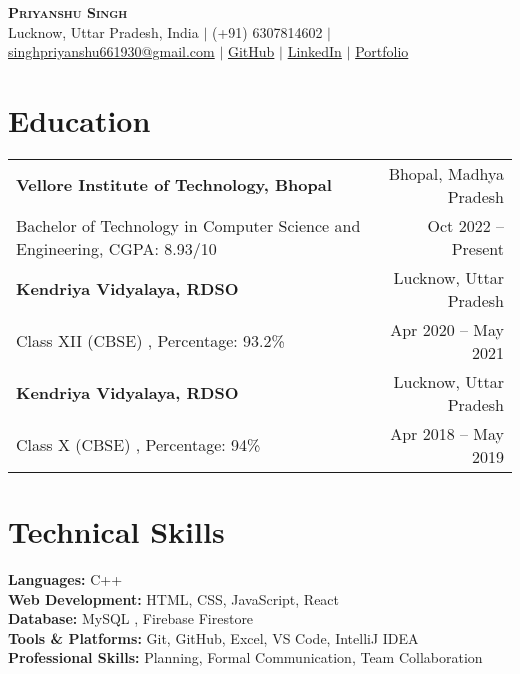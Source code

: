 \documentclass[letterpaper,10pt]{article}
\begin{document}

\begin{center}
    \textbf{\Huge \scshape Priyanshu Singh} \\ \vspace{1pt}
    \small Lucknow, Uttar Pradesh, India $|$ (+91) 6307814602 $|$ \href{mailto:singhpriyanshu661930@gmail.com}{singhpriyanshu661930@gmail.com} $|$ 
    \href{https://github.com/priyanshusingh017}{GitHub} $|$
    \href{https://www.linkedin.com/in/priyanshu-singh-00s7}{LinkedIn} $|$
    \href{https://priyanshusingh017.github.io/Portfolio/}{Portfolio}
\end{center}

\section{Education}
\begin{tabularx}{\linewidth}{X r}
  \textbf{Vellore Institute of Technology, Bhopal} & Bhopal, Madhya Pradesh \\
  \hspace{0.5em}Bachelor of Technology in Computer Science and Engineering, CGPA: 8.93/10 & Oct 2022 -- Present \\
  [5pt]
  
  \textbf{Kendriya Vidyalaya, RDSO} & Lucknow, Uttar Pradesh \\
  \hspace{0.5em}Class XII (CBSE) , Percentage: 93.2\% & Apr 2020 -- May 2021 \\[5pt]
  
  \textbf{Kendriya Vidyalaya, RDSO} & Lucknow, Uttar Pradesh \\
  \hspace{0.5em}Class X (CBSE) , Percentage: 94\% & Apr 2018 -- May 2019 \\
\end{tabularx}

\section{Technical Skills}
\begin{itemize}[leftmargin=0.15in, label={}, noitemsep, nolistsep]
  \small{
    \item{
      \textbf{Languages:} C++ \\
      \textbf{Web Development:} HTML, CSS, JavaScript, React \\
      \textbf{Database:} MySQL , Firebase Firestore \\
      \textbf{Tools \& Platforms:} Git, GitHub, Excel, VS Code, IntelliJ IDEA\\
      \textbf{Professional Skills:} Planning, Formal Communication, Team Collaboration \\
  }
  }
\end{itemize}
\end{document}
